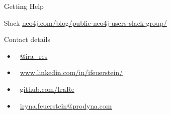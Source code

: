 \documentclass[12pt]{beamer}
\begin{document}
    \begin{frame}{Getting Help}
        \begin{block}{Slack}
            \url{neo4j.com/blog/public-neo4j-users-slack-group/}
        \end{block}
        \pause
        \begin{block}{Contact details}
            \begin{itemize}
                \item \faTwitter \(\;\) \url{@ira_res}
                \item \faLinkedin \(\;\) \url{www.linkedin.com/in/ifeuerstein/}
                \item \faGithub \(\;\) \url{github.com/IraRe}
                \item \Email \(\;\) \url{iryna.feuerstein@prodyna.com}
            \end{itemize}
        \end{block}
    \end{frame}
    
\end{document}
